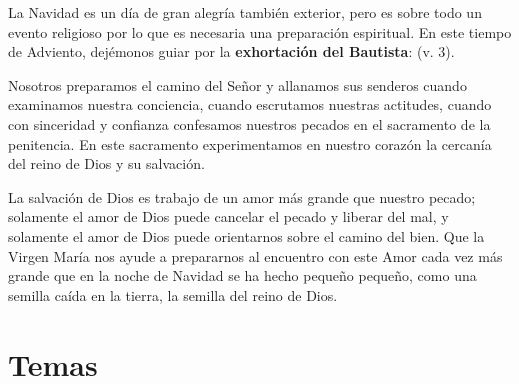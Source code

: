 \begin{body}
				La Navidad es un día de gran alegría también exterior, pero es sobre todo un evento religioso por lo que es necesaria una preparación espiritual. En este tiempo de Adviento, dejémonos guiar por la \textbf{exhortación del Bautista}:  (v. 3).
				
				Nosotros preparamos el camino del Señor y allanamos sus senderos cuando examinamos nuestra conciencia, cuando escrutamos nuestras actitudes, cuando con sinceridad y confianza confesamos nuestros pecados en el sacramento de la penitencia. En este sacramento experimentamos en nuestro corazón la cercanía del reino de Dios y su salvación.
				
				La salvación de Dios es trabajo de un amor más grande que nuestro pecado; solamente el amor de Dios puede cancelar el pecado y liberar del mal, y solamente el amor de Dios puede orientarnos sobre el camino del bien. Que la Virgen María nos ayude a prepararnos al encuentro con este Amor cada vez más grande que en la noche de Navidad se ha hecho pequeño pequeño, como una semilla caída en la tierra, la semilla del reino de Dios.
			\end{body}	

\newsection

	\section{Temas}
	    
		
